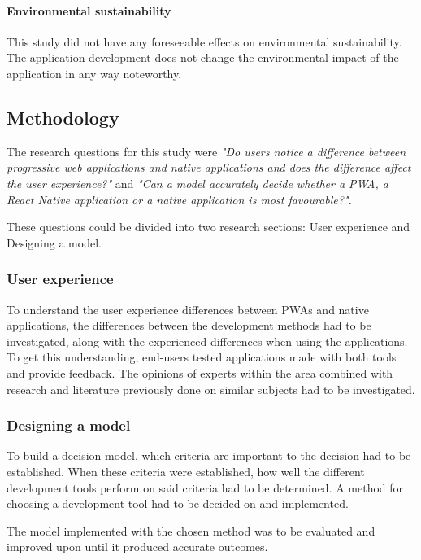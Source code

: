 \paragraph{Environmental sustainability}

This study did not have any foreseeable effects on environmental sustainability. The application development does not change the environmental impact of the application in any way noteworthy.

\subsection{Methodology}

The research questions for this study were\textit{ "Do users notice a difference between progressive web applications and native applications and does the difference affect the user experience?"}
and \textit{"Can a model accurately decide whether a PWA, a React Native application or a native application is most favourable?".}

These questions could be divided into two research sections: User experience and Designing a model.

\subsubsection{User experience}

To understand the user experience differences between PWAs and native applications, the differences between the development methods had to be investigated, along with the experienced differences when using the applications. 
To get this understanding, end-users tested applications made with both tools and provide feedback. The opinions of experts within the area combined with research and literature previously done on similar subjects had to be investigated.  

\subsubsection{Designing a model}

To build a decision model, which criteria are important to the decision had to be established. 
When these criteria were established, how well the different development tools perform on said criteria had to be determined. A method for choosing a development tool had to be decided on and implemented. 

The model implemented with the chosen method was to be evaluated and improved upon until it produced accurate outcomes.

